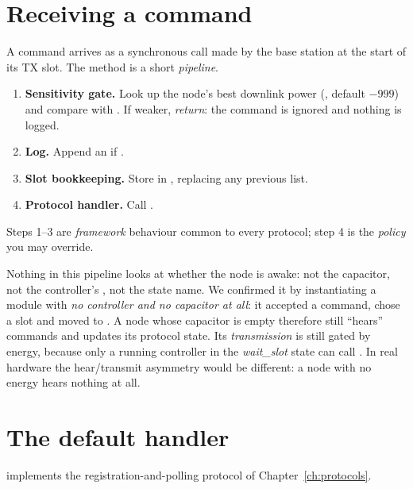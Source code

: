 \section{Receiving a command}
\label{sec:rxcommand}

A command arrives as a synchronous call  made by the base station at the start of its TX slot. The method is a short \emph{pipeline}.
\begin{enumerate}
 \item \textbf{Sensitivity gate.} Look up the node's best downlink power (, default $-999$) and compare with . If weaker, \emph{return}: the command is ignored and nothing is logged.
 \item \textbf{Log.} Append an  if .
 \item \textbf{Slot bookkeeping.} Store  in , replacing any previous list.
 \item \textbf{Protocol handler.} Call .
\end{enumerate}
Steps 1--3 are \emph{framework} behaviour common to every protocol; step 4 is the \emph{policy} you may override.

\begin{keyidea}
Nothing in this pipeline looks at whether the node is awake: not the capacitor, not the controller's , not the state name. We confirmed it by instantiating a module with \emph{no controller and no capacitor at all}: it accepted a  command, chose a slot and moved to . A node whose capacitor is empty therefore still ``hears'' commands and updates its protocol state. Its \emph{transmission} is still gated by energy, because only a running controller in the \emph{wait\_slot} state can call . In real hardware the hear/transmit asymmetry would be different: a node with no energy hears nothing at all.
\end{keyidea}

\section{The default handler}
\label{sec:handler}

 implements the registration-and-polling protocol of Chapter~\ref{ch:protocols}.

